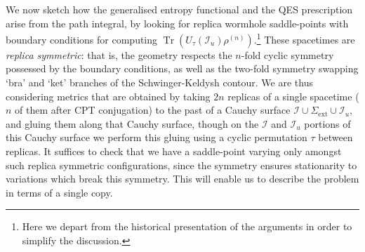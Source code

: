 \documentclass[letterpaper,12pt]{article}
\DeclareMathOperator{\Tr}{Tr}
\newcommand*{\scri}{\mathscr{I}} %
\newcommand*{\island}{\mathcal{I}}
\begin{document}
We now sketch how the generalised entropy functional and the QES prescription arise from the path integral, by looking for replica wormhole saddle-points with boundary conditions for computing $\Tr \left( U_\tau(\scri_u) \rho^{(n)} \right)$.\footnote{Here we depart from the historical presentation of the arguments in order to simplify the discussion.} These spacetimes are \emph{replica symmetric}: that is, the geometry respects the $n$-fold cyclic symmetry possessed by the boundary conditions, as well as the two-fold symmetry swapping `bra' and `ket' branches of the Schwinger-Keldysh contour. We are thus considering metrics that are obtained by taking $2n$ replicas of a single spacetime ($n$ of them after CPT conjugation) to the past of a Cauchy surface $\island\cup \Sigma_\mathrm{ext}\cup\scri_u$, and gluing them along that Cauchy surface, though on the $\island$ and $\scri_u$ portions of this Cauchy surface we perform this gluing using a cyclic permutation $\tau$ between replicas. It suffices to check that we have a saddle-point varying only amongst such replica symmetric configurations, since the symmetry ensures stationarity to variations which break this symmetry. This will enable us to describe the problem in terms of a single copy.
\end{document}
